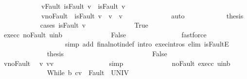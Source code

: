 \begin{isabellebody}
\ \ \ \ \ \ \ \ \ \ \ \ v{\isacharunderscore}Fault{\isacharcolon}\ {\isachardoublequoteopen}isFault\ v\ {\isasymlongrightarrow}\ isFault\ v{\isacharprime}{\isachardoublequoteclose}\ \ \isanewline
\ \ \ \ \ \ \ \ \ \ \ \ v{\isacharprime}{\isacharunderscore}noFault{\isacharcolon}\ {\isachardoublequoteopen}{\isasymnot}\ isFault\ v{\isacharprime}\ {\isasymlongrightarrow}\ v{\isacharprime}\ {\isacharequal}\ v{\isachardoublequoteclose}\isanewline
\ \ \ \ \ \ \ \ \ \ \ \ \isamarkupfalse%
\ auto\isanewline
\ \ \ \ \ \ \ \ \ \ \isamarkupfalse%
\ {\isacharquery}thesis\isanewline
\ \ \ \ \ \ \ \ \ \ \isamarkupfalse%
\ {\isacharparenleft}cases\ {\isachardoublequoteopen}isFault\ v{\isacharprime}{\isachardoublequoteclose}{\isacharparenright}\isanewline
\ \ \ \ \ \ \ \ \ \ \ \ \isamarkupfalse%
\ True\isanewline
\ \ \ \ \ \ \ \ \ \ \ \ \isamarkupfalse%
\ exec{\isacharunderscore}c{\isacharprime}\ noFault\ u{\isacharunderscore}in{\isacharunderscore}b\isanewline
\ \ \ \ \ \ \ \ \ \ \ \ \isamarkupfalse%
\ False\isanewline
\ \ \ \ \ \ \ \ \ \ \ \ \ \ \isamarkupfalse%
\ {\isacharparenleft}fastforce\ \isanewline
\ \ \ \ \ \ \ \ \ \ \ \ \ \ \ \ \ \ \ simp\ add{\isacharcolon}\ final{\isacharunderscore}notin{\isacharunderscore}def\ intro{\isacharcolon}\ exec{\isachardot}intros\ elim{\isacharcolon}\ isFaultE{\isacharparenright}\isanewline
\ \ \ \ \ \ \ \ \ \ \ \ \isamarkupfalse%
\ {\isacharquery}thesis\ \isacommand{{\isachardot}{\isachardot}}\isamarkupfalse%
\isanewline
\ \ \ \ \ \ \ \ \ \ \isamarkupfalse%
\isanewline
\ \ \ \ \ \ \ \ \ \ \ \ \isamarkupfalse%
\ False\isanewline
\ \ \ \ \ \ \ \ \ \ \ \ \isamarkupfalse%
\ v{\isacharprime}{\isacharunderscore}noFault\ \isamarkupfalse%
\ v{\isacharprime}{\isacharcolon}\ {\isachardoublequoteopen}v{\isacharprime}{\isacharequal}v{\isachardoublequoteclose}\isanewline
\ \ \ \ \ \ \ \ \ \ \ \ \ \ \isamarkupfalse%
\ simp\isanewline
\ \ \ \ \ \ \ \ \ \ \ \ \isamarkupfalse%
\ noFault\ exec{\isacharunderscore}c{\isacharprime}\ u{\isacharunderscore}in{\isacharunderscore}b\isanewline
\ \ \ \ \ \ \ \ \ \ \ \ \isamarkupfalse%
\ {\isachardoublequoteopen}{\isasymGamma}{\isasymturnstile}{\isasymlangle}While\ b\ c{\isacharprime}{\isacharcomma}v\ {\isasymrangle}\ {\isasymRightarrow}{\isasymnotin}Fault\ {\isacharbackquote}\ UNIV{\isachardoublequoteclose}\isanewline
\ \ \ \ \ \ \ \ \ \ \ \ \ \ \isamarkupfalse%

\end{isabellebody}
